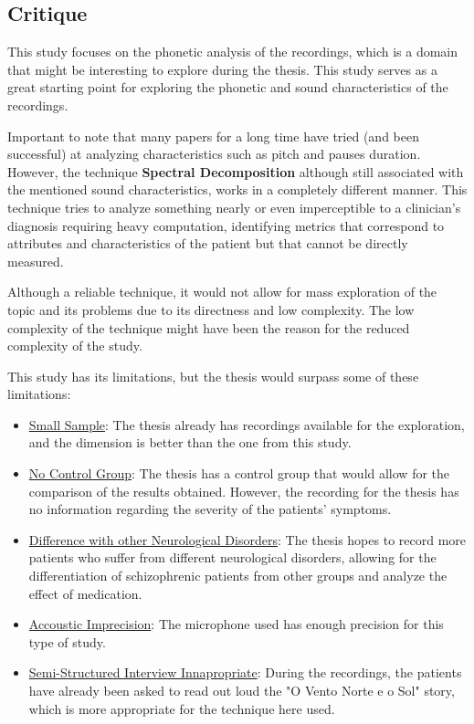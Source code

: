 \documentclass{Paper_Summary}
\begin{document}
\makepapertitle

\breakline

\begin{center}
    \section*{Critique}
\end{center}

    This study focuses on the phonetic analysis of the recordings, which is a domain that might be interesting to explore during the thesis. This study serves as a great starting point for exploring the phonetic and sound characteristics of the recordings.

    Important to note that many papers for a long time have tried (and been successful) at analyzing characteristics such as pitch and pauses duration. However, the technique \textbf{Spectral Decomposition} although still associated with the mentioned sound characteristics, works in a completely different manner. This technique tries to analyze something nearly or even imperceptible to a clinician's diagnosis requiring heavy computation, identifying metrics that correspond to attributes and characteristics of the patient but that cannot be directly measured.

    Although a reliable technique, it would not allow for mass exploration of the topic and its problems due to its directness and low complexity.
    The low complexity of the technique might have been the reason for the reduced complexity of the study.

    This study has its limitations, but the thesis would surpass some of these limitations:
    \begin{itemize}
        \item \underline{Small Sample}: The thesis already has recordings available for the exploration, and the dimension is better than the one from this study.
        \item \underline{No Control Group}: The thesis has a control group that would allow for the comparison of the results obtained. However, the recording for the thesis has no information regarding the severity of the patients' symptoms.
        \item \underline{Difference with other Neurological Disorders}: The thesis hopes to record more patients who suffer from different neurological disorders, allowing for the differentiation of schizophrenic patients from other groups and analyze the effect of medication.
        \item \underline{Accoustic Imprecision}: The microphone used has enough precision for this type of study.
        \item \underline{Semi-Structured Interview Innapropriate}: During the recordings, the patients have already been asked to read out loud the "O Vento Norte e o Sol" story, which is more appropriate for the technique here used.
    \end{itemize}

\breakline
\end{document}
